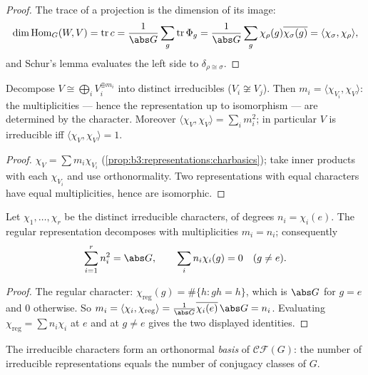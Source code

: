 \begin{proof}
The trace of a projection is the dimension of its image:
\[
\dim\operatorname{Hom}_G(W, V) = \operatorname{tr} c
= \frac1{\abs G}\sum_g \operatorname{tr}\Phi_g
= \frac1{\abs G}\sum_g \chi_\rho(g)\overline{\chi_\sigma(g)}
= \langle \chi_\sigma, \chi_\rho\rangle,
\]
and Schur's lemma evaluates the left side to $\delta_{\rho \cong
\sigma}$.
\end{proof}

\begin{corollary}\label{cor:b3:representations:multiplicity}
Decompose $V \cong \bigoplus_i V_i^{\oplus m_i}$ into distinct
irreducibles ($V_i \not\cong V_j$). Then $m_i = \langle
\chi_{V_i}, \chi_V\rangle$: the multiplicities --- hence the
representation up to isomorphism --- are determined by the
character. Moreover $\langle \chi_V, \chi_V\rangle = \sum_i
m_i^2$; in particular $V$ is irreducible iff $\langle\chi_V,
\chi_V\rangle = 1$.
\end{corollary}

\begin{proof}
$\chi_V = \sum m_i\chi_{V_i}$
(\cref{prop:b3:representations:charbasics}); take inner products
with each $\chi_{V_i}$ and use orthonormality. Two
representations with equal characters have equal multiplicities,
hence are isomorphic.
\end{proof}

\begin{theorem}
\label{thm:b3:representations:regular}
Let $\chi_1, \dots, \chi_r$ be the distinct irreducible
characters, of degrees $n_i = \chi_i(e)$. The regular
representation decomposes with multiplicities $m_i = n_i$;
consequently
\[
\sum_{i=1}^{r} n_i^2 = \abs G,
\qquad
\sum_i n_i\chi_i(g) = 0 \quad (g \neq e).
\]
\end{theorem}

\begin{proof}
The regular character: $\chi_{\mathrm{reg}}(g) =
\#\{h : gh = h\}$, which is $\abs G$ for $g = e$ and $0$
otherwise. So $m_i = \langle \chi_i,\chi_{\mathrm{reg}}\rangle =
\frac1{\abs G}\overline{\chi_i(e)}\,\abs G = n_i$. Evaluating
$\chi_{\mathrm{reg}} = \sum n_i\chi_i$ at $e$ and at $g \neq e$
gives the two displayed identities.
\end{proof}

\begin{theorem}\label{thm:b3:representations:numberirr}
The irreducible characters form an orthonormal \emph{basis} of
$\mathcal{CF}(G)$: the number of irreducible representations
equals the number of conjugacy classes of $G$.
\end{theorem}


